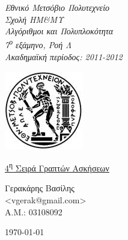 \begin{titlepage}
\begin{center}

\noindent\begin{minipage}[b]{.55\textwidth}
\begin{Large}
\emph{Εθνικό Μετσόβιο Πολυτεχνείο\\
Σχολή ΗΜ\&ΜΥ\\
Αλγόριθμοι και Πολυπλοκότητα\\
7\textsuperscript{ο} εξάμηνο, Ροή Λ\\
Ακαδημαϊκή περίοδος: 2011-2012\\}
\end{Large}
\end{minipage}%
\begin{minipage}[b]{.45\textwidth}
     \centering
     \includegraphics[scale=0.8]{title/ntua_logo}
\end{minipage}

\vspace{5cm}
\begin{huge}
\underline{4\textsuperscript{η} Σειρά Γραπτών Ασκήσεων}
\end{huge}
\vfill

\begin{flushright}
\Large{Γερακάρης Βασίλης}\\
\large{<vgerak@gmail.com> }\\
\large{Α.Μ.: 03108092}\\
\end{flushright}
\vspace{1cm}

\large\today\\
\end{center}
\end{titlepage}

